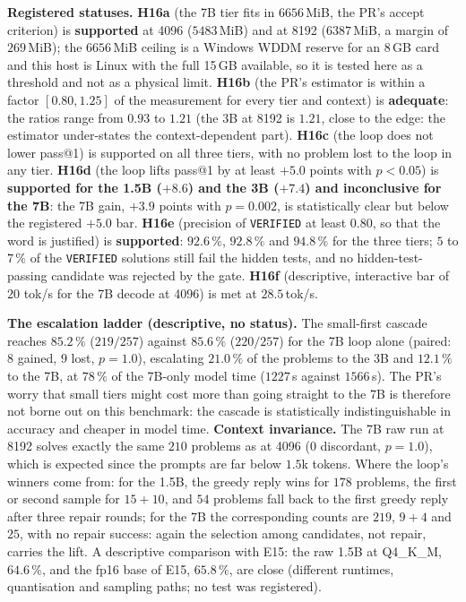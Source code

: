 \documentclass[11pt,a4paper]{article}
\begin{document}
\textbf{Registered statuses.} \textbf{H16a} (the 7B tier fits in $6656$\,MiB, the PR's accept criterion) is \textbf{supported} at 4096 ($5483$\,MiB) and at 8192 ($6387$\,MiB, a margin of $269$\,MiB); the $6656$\,MiB ceiling is a Windows WDDM reserve for an 8\,GB card and this host is Linux with the full 15\,GB available, so it is tested here as a threshold and not as a physical limit. \textbf{H16b} (the PR's estimator is within a factor $[0.80, 1.25]$ of the measurement for every tier and context) is \textbf{adequate}: the ratios range from $0.93$ to $1.21$ (the 3B at 8192 is $1.21$, close to the edge: the estimator under-states the context-dependent part). \textbf{H16c} (the loop does not lower pass@1) is supported on all three tiers, with no problem lost to the loop in any tier. \textbf{H16d} (the loop lifts pass@1 by at least $+5.0$ points with $p<0.05$) is \textbf{supported for the 1.5B ($+8.6$) and the 3B ($+7.4$) and inconclusive for the 7B}: the 7B gain, $+3.9$ points with $p=0.002$, is statistically clear but below the registered $+5.0$ bar. \textbf{H16e} (precision of \texttt{VERIFIED} at least $0.80$, so that the word is justified) is \textbf{supported}: $92.6\,\%$, $92.8\,\%$ and $94.8\,\%$ for the three tiers; $5$ to $7\,\%$ of the \texttt{VERIFIED} solutions still fail the hidden tests, and no hidden-test-passing candidate was rejected by the gate. \textbf{H16f} (descriptive, interactive bar of $20$ tok/s for the 7B decode at 4096) is met at $28.5$\,tok/s.

\textbf{The escalation ladder (descriptive, no status).} The small-first cascade reaches $85.2\,\%$ ($219/257$) against $85.6\,\%$ ($220/257$) for the 7B loop alone (paired: $8$ gained, $9$ lost, $p=1.0$), escalating $21.0\,\%$ of the problems to the 3B and $12.1\,\%$ to the 7B, at $78\,\%$ of the 7B-only model time ($1227$\,s against $1566$\,s). The PR's worry that small tiers might cost more than going straight to the 7B is therefore not borne out on this benchmark: the cascade is statistically indistinguishable in accuracy and cheaper in model time. \textbf{Context invariance.} The 7B raw run at 8192 solves exactly the same $210$ problems as at 4096 ($0$ discordant, $p=1.0$), which is expected since the prompts are far below $1.5$k tokens. Where the loop's winners come from: for the 1.5B, the greedy reply wins for $178$ problems, the first or second sample for $15+10$, and $54$ problems fall back to the first greedy reply after three repair rounds; for the 7B the corresponding counts are $219$, $9+4$ and $25$, with no repair success: again the selection among candidates, not repair, carries the lift. A descriptive comparison with E15: the raw 1.5B at Q4\_K\_M, $64.6\,\%$, and the fp16 base of E15, $65.8\,\%$, are close (different runtimes, quantisation and sampling paths; no test was registered).
\end{document}
